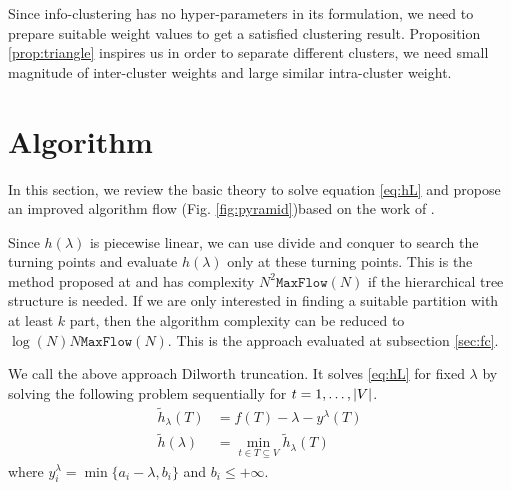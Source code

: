 \documentclass{article}
\begin{document}
Since info-clustering has no hyper-parameters in its formulation, we need to prepare suitable weight values to get a satisfied clustering result.
Proposition \ref{prop:triangle} inspires us in order to separate different clusters, we need small magnitude of inter-cluster weights and large similar intra-cluster weight.

\section{Algorithm}\label{sec:algorithm}

In this section, we review the basic theory to solve equation \eqref{eq:hL} and propose an improved algorithm flow (Fig. \ref{fig:pyramid})based on the work of \cite{RN4}. 

Since $h(\lambda)$ is piecewise linear, we can use divide and conquer to search the turning points and evaluate $h(\lambda)$ only at these turning points. This is the method proposed at \cite{RN7} and has complexity $N^2 \mathtt{MaxFlow}(N)$ if the hierarchical tree structure is needed. If we are only interested in finding a suitable partition  with at least $k$ part, then the algorithm complexity can be reduced to $\log(N) N \mathtt{MaxFlow}(N)$. This is the approach evaluated at subsection \ref{sec:fc}.

We call the above approach Dilworth truncation. It solves \eqref{eq:hL} for fixed $\lambda$  by solving the following problem sequentially for $t=1,\dots,\lvert V\rvert$.
\begin{align}
\tilde{h}_{\lambda}(T) &= f(T) - \lambda - y^{\lambda}(T)\\
\tilde{h}(\lambda) & = \min_{t \in T \subseteq V} \tilde{h}_{\lambda}(T) \label{eq:pmq}
\end{align}
where
$y^{\lambda}_i = \min\{a_i - \lambda, b_i\}$  and $b_i \leq +\infty$. 
\end{document}
